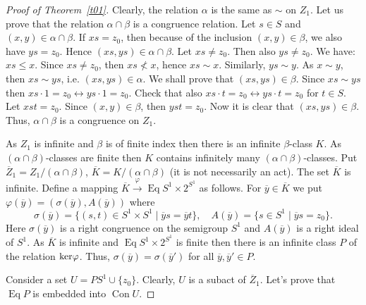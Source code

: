 \documentclass{birkau}
\numberwithin{equation}{section}
\theoremstyle{plain}
\theoremstyle{definition}
\DeclareMathOperator{\Con}{Con}
\DeclareMathOperator{\Eq}{Eq}
\begin{document}
\begin{proof}[Proof of Theorem~\ref{t01}]
		Clearly, the relation $\alpha$ is the same as $\sim$ on $Z_1$. Let us prove that the relation $\alpha \cap \beta$ is a congruence relation. Let $s \in S$ and $(x,y) \in \alpha \cap \beta$. If $xs = z_0$, then because of the inclusion $(x,y) \in \beta$, we also have $ys = z_0$. Hence $(xs,ys) \in \alpha \cap \beta$. Let $xs \neq z_0$. Then also $ ys \neq z_0 $. We have: $xs \leqslant x$. Since $xs \neq z_0$, then $xs \not < x$, hence $xs \sim x$. Similarly, $ys \sim y$. As $x \sim y$, then $ xs \sim ys$, i.e. $(xs,ys) \in \alpha$. We shall prove that $(xs,ys) \in \beta$. Since $xs \sim ys$ then $xs \cdot 1 = z_0 \leftrightarrow ys \cdot 1 = z_0$. Check that also $xs \cdot t = z_0 \leftrightarrow ys \cdot t = z_0$ for $t \in S$. Let $xst = z_0$. Since $(x,y) \in \beta$, then $yst = z_0$. Now it is clear that $(xs,ys) \in \beta$. Thus, $\alpha \cap \beta$ is a congruence on $Z_1$.
		
        As $Z_1$ is infinite and $\beta$ is of finite index then there is an infinite $\beta$-class $K$. As $(\alpha \cap \beta)$-classes are finite then $K$ contains infinitely many $(\alpha \cap \beta)$-classes. Put $\overline Z_1 = Z_1/(\alpha \cap \beta)$, $\overline K=K/(\alpha \cap \beta)$ (it is not necessarily an act). The set $\overline K$ is infinite. Define a mapping $\overline K \xrightarrow{\varphi}\Eq {S^1} \times 2^{S^1}$ as follows. For $\overline y \in \overline K$ we put $\varphi ( \overline y)=(\sigma(\overline y), A(\overline y))$ where $$ \sigma (\overline y) = \{ (s,t) \in S^1 \times S^1 \mid \overline y s=\overline y t\}, \quad A(\overline y) = \{ s\in S^1 \mid \overline y s =z_0 \}.$$ Here $ \sigma (\overline y)$ is a right congruence on the semigroup $S^1$ and $A(\overline y)$ is a right ideal of $S^1$. As $\overline K$ is infinite and $\Eq{S^1} \times 2^{S^1}$ is finite then there is an infinite class $P$ of the relation ${\rm ker}\varphi$. Thus, $\sigma (\overline y) =\sigma (\overline y')$ for all $\overline y, \overline y' \in P.$

        Consider a set $U=PS^1\cup\{z_0\}.$ Clearly, $U$ is a subact of $\overline Z_1.$ Let's prove that $\Eq P$ is embedded into $\Con U$.


\end{proof}
\end{document}
